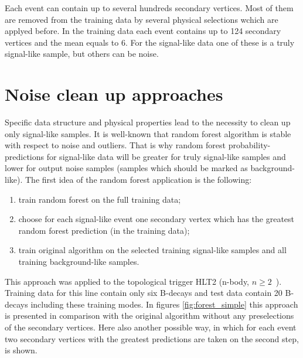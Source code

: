 \documentclass{llncs}
\begin{document}
Each event can contain up to several hundreds secondary vertices. Most of them are removed from the training data by several physical selections wchich are applyed before. In the training data each event contains up to 124 secondary vertices and the mean equals to 6. For the signal-like data one of these is a truly signal-like sample, but others can be noise.

\section{Noise clean up approaches}

Specific data structure and physical properties lead to the necessity to clean up only signal-like samples. It is well-known \cite{forest} that random forest algorithm is stable with respect to noise and outliers. That is why random forest probability-predictions for signal-like data will be greater for truly signal-like samples and lower for output noise samples (samples which should be marked as background-like). The first idea of the random forest application is the following: 
\begin{enumerate}
	\item train random forest on the full training data;
	\item choose for each signal-like event one secondary vertex which has the greatest random forest prediction (in the training data);
	\item train original algorithm on the selected training signal-like samples and all training background-like samples.
\end{enumerate}

This approach was applied to the topological trigger HLT2 (n-body, $n \geq 2$~). Training data for this line contain only six B-decays and test data contain 20 B-decays including these training modes. In figures \ref{fig:forest_simple} this approach is presented in comparison with the original algorithm without any preselections of the secondary vertices. Here also another possible way, in which for each event two secondary vertices with the greatest predictions are taken on the second step, is shown.
\end{document}
